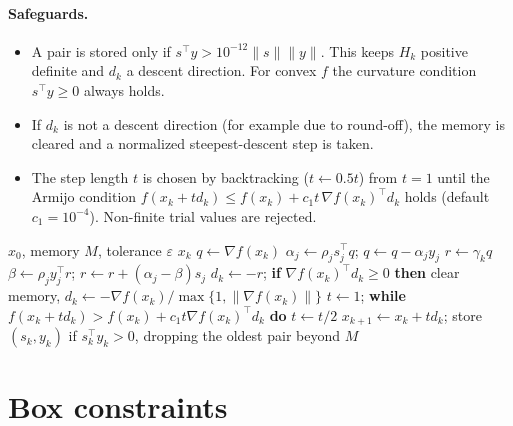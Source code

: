 \documentclass[11pt,a4paper]{article}
\newcommand{\norm}[1]{\lVert #1\rVert}
\begin{document}
\paragraph{Safeguards.}
\begin{itemize}
  \item A pair is stored only if $s^\top y > 10^{-12}\norm{s}\norm{y}$.
        This keeps $H_k$ positive definite and $d_k$ a descent direction.
        For convex $f$ the curvature condition $s^\top y\ge 0$ always holds.
  \item If $d_k$ is not a descent direction (for example due to round-off), the memory is
        cleared and a normalized steepest-descent step is taken.
  \item The step length $t$ is chosen by backtracking ($t\gets 0.5t$) from $t=1$
        until the Armijo condition
        $f(x_k+t d_k)\le f(x_k)+c_1 t\,\nabla f(x_k)^\top d_k$ holds
        (default $c_1=10^{-4}$). Non-finite trial values are rejected.
\end{itemize}

\begin{algorithm}[ht]
\caption{L-BFGS with Armijo backtracking}\label{alg:lbfgs}
\begin{algorithmic}[1]
\Require $x_0$, memory $M$, tolerance $\varepsilon$
  \If{$\norm{\nabla f(x_k)}_\infty\le\varepsilon$} \Return $x_k$ \EndIf
  \State $q\gets\nabla f(x_k)$
   
    \State $\alpha_j\gets\rho_j s_j^\top q$; \quad $q\gets q-\alpha_j y_j$
  \EndFor
  \State $r\gets\gamma_k q$
   
    \State $\beta\gets\rho_j y_j^\top r$; \quad $r\gets r+(\alpha_j-\beta)s_j$
  \EndFor
  \State $d_k\gets -r$; \textbf{if} $\nabla f(x_k)^\top d_k\ge 0$ \textbf{then} clear memory, $d_k\gets-\nabla f(x_k)/\max\{1,\norm{\nabla f(x_k)}\}$
  \State $t\gets 1$; \textbf{while} $f(x_k+td_k)>f(x_k)+c_1t\nabla f(x_k)^\top d_k$ \textbf{do} $t\gets t/2$
  \State $x_{k+1}\gets x_k+td_k$; store $(s_k,y_k)$ if $s_k^\top y_k>0$, dropping the oldest pair beyond $M$
\EndFor
\end{algorithmic}
\end{algorithm}

\section{Box constraints}\label{sec:box}
\end{document}
